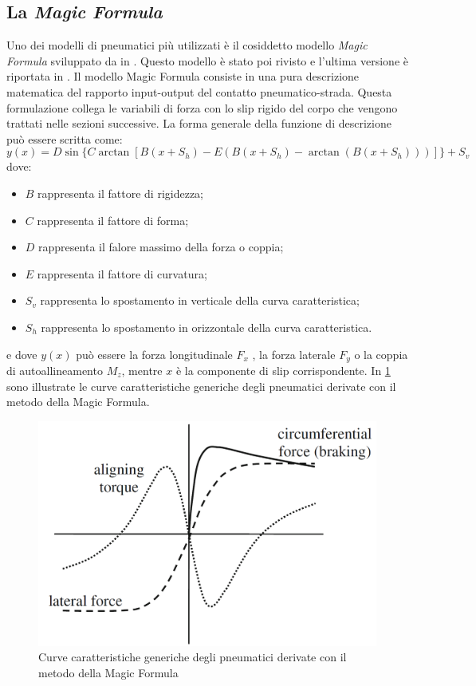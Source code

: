 \subsection{La \textit{Magic Formula}}
Uno dei modelli di pneumatici più utilizzati è il cosiddetto modello \textit{Magic Formula} sviluppato da \citeauthor{bakker} in \cite{bakker}. Questo modello è stato poi rivisto e l'ultima versione è riportata in \cite{hans}. Il modello Magic Formula consiste in una pura descrizione matematica del rapporto input-output del contatto pneumatico-strada. Questa formulazione collega le variabili di forza con lo slip rigido del corpo che vengono trattati nelle sezioni successive. La forma generale della funzione di descrizione può essere scritta come:
%
\begin{equation}
y(x) = D\sin\{C\arctan[B(x + S_h ) - E(B(x + S_h ) - \arctan(B(x + S_h )))]\} + S_v
\end{equation}
%
dove:
\begin{itemize}
	\item $B$ rappresenta il fattore di rigidezza;
	\item $C$ rappresenta il fattore di forma;
	\item $D$ rappresenta il falore massimo della forza o coppia;
	\item $E$ rappresenta il fattore di curvatura;
	\item $S_v$ rappresenta lo spostamento in verticale della curva caratteristica;
	\item $S_h$ rappresenta lo spostamento in orizzontale della curva caratteristica.
\end{itemize}
e dove $y(x)$ può essere la forza longitudinale $F_x$ , la forza laterale $F_y$ o la coppia di autoallineamento $M_z$, mentre $x$ è la componente di slip corrispondente. In \figurename{ \ref{pacejka}} sono illustrate le curve caratteristiche generiche degli pneumatici derivate con il metodo della Magic Formula.
%
\begin{figure}[h]
	\centering
	\includegraphics[width=0.58\linewidth]{Figures/pacejka}
	\caption{Curve caratteristiche generiche degli pneumatici derivate con il metodo della Magic Formula}
	\label{pacejka}
\end{figure}

